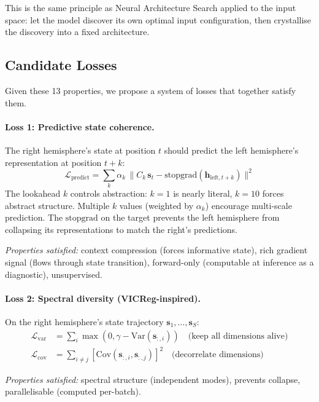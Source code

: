 \documentclass[11pt, a4paper]{article}
\newcommand{\h}{\mathbf{h}}
\theoremstyle{plain}
\theoremstyle{definition}
\theoremstyle{remark}
\begin{document}
This is the same principle as Neural Architecture Search applied to the input space: let the model discover its own optimal input configuration, then crystallise the discovery into a fixed architecture.


\subsection{Candidate Losses}

Given these 13 properties, we propose a system of losses that together satisfy them.

\paragraph{Loss 1: Predictive state coherence.}
The right hemisphere's state at position $t$ should predict the left hemisphere's representation at position $t + k$:
\begin{equation}
\mathcal{L}_{\mathrm{predict}} = \sum_k \alpha_k \, \| C_k \, \mathbf{s}_t - \mathrm{stopgrad}(\h_{\mathrm{left}, t+k}) \|^2
\end{equation}
The lookahead $k$ controls abstraction: $k = 1$ is nearly literal, $k = 10$ forces abstract structure.
Multiple $k$ values (weighted by $\alpha_k$) encourage multi-scale prediction.
The $\mathrm{stopgrad}$ on the target prevents the left hemisphere from collapsing its representations to match the right's predictions.

\emph{Properties satisfied:} context compression (forces informative state), rich gradient signal (flows through state transition), forward-only (computable at inference as a diagnostic), unsupervised.

\paragraph{Loss 2: Spectral diversity (VICReg-inspired).}
On the right hemisphere's state trajectory $\mathbf{s}_1, \ldots, \mathbf{s}_S$:
\begin{align}
\mathcal{L}_{\mathrm{var}} &= \sum_i \max(0, \gamma - \mathrm{Var}(\mathbf{s}_{:,i})) \quad \text{(keep all dimensions alive)} \\
\mathcal{L}_{\mathrm{cov}} &= \sum_{i \neq j} [\mathrm{Cov}(\mathbf{s}_{:,i}, \mathbf{s}_{:,j})]^2 \quad \text{(decorrelate dimensions)}
\end{align}

\emph{Properties satisfied:} spectral structure (independent modes), prevents collapse, parallelisable (computed per-batch).
\end{document}
